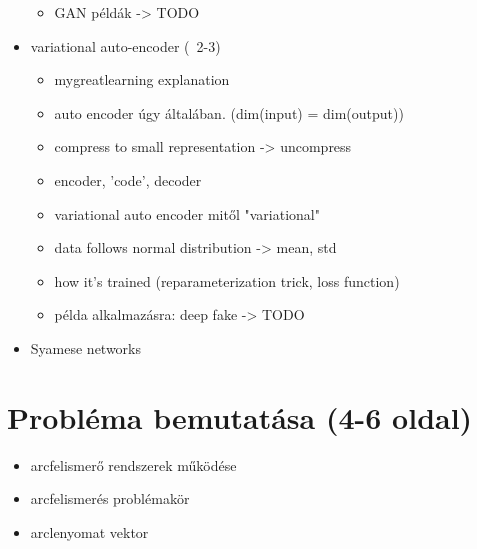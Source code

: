 \begin{itemize}
\begin{itemize}
		\item GAN példák -> TODO
	\end{itemize}
	\item variational auto-encoder (~2-3)
	\begin{itemize}
		\item mygreatlearning explanation
		\item auto encoder úgy általában. (dim(input) = dim(output))
		\item compress to small representation -> uncompress
		\item encoder, 'code', decoder
		\item variational auto encoder mitől "variational"
		\item data follows normal distribution -> mean, std
		\item how it's trained (reparameterization trick, loss function)
		\item példa alkalmazásra: deep fake -> TODO
	\end{itemize}
	\item Syamese networks
\end{itemize}


\section{Probléma bemutatása (4-6 oldal)} 
\begin{itemize}
	\item arcfelismerő rendszerek működése
	\item arcfelismerés problémakör
	\item arclenyomat vektor
\end{itemize}

